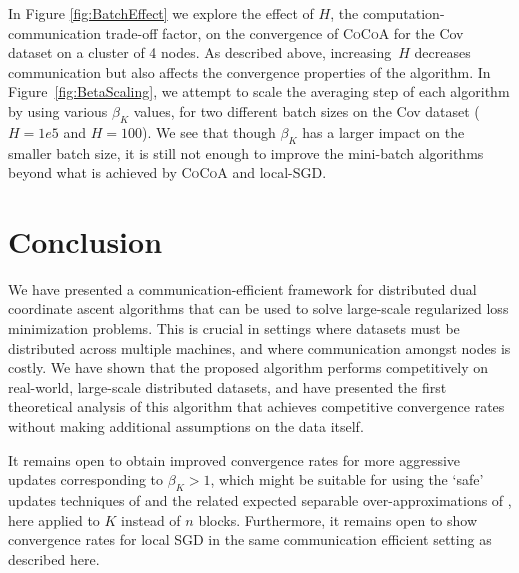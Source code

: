 \documentclass{article} %
\newcommand{\algname}{\textsc{CoCoA}\xspace}  %
\begin{document}


In Figure \ref{fig:BatchEffect} we explore the effect of $H$, 
the computation-communication trade-off factor, on the
convergence of \algname for the Cov dataset on a cluster of 4 nodes.
As described above, increasing~$H$ decreases communication 
but also affects the convergence properties of the algorithm. In 
Figure~\ref{fig:BetaScaling}, we attempt to scale the averaging step of each
algorithm by using various $\beta_K$ values, for two different batch sizes on
the Cov dataset ($H=1e5$ and $H=100$). We see that though $\beta_K$ has a
larger impact on the smaller batch size, it is still not enough to improve
the mini-batch algorithms beyond what is achieved by \algname and local-SGD.




%
\section{Conclusion} \label{conclusion}

We have presented a communication-efficient framework for distributed dual
coordinate ascent algorithms that can be used to solve large-scale regularized
loss minimization problems. This is crucial in settings where datasets must
be distributed across multiple machines, and where communication amongst nodes
is costly. We have shown that the proposed algorithm performs competitively on
real-world, large-scale distributed datasets, and have presented the first
theoretical analysis of this algorithm that achieves competitive convergence
rates without making additional assumptions on the data itself.

It remains open to obtain improved convergence rates for more aggressive
updates corresponding to $\beta_K > 1$, which might be suitable for using the
`safe' updates techniques of  \cite{Takac:2013ut} and the related expected
separable over-approximations of \cite{Richtarik:2014fe,Richtarik:2012vf}, here applied to $K$
instead of $n$ blocks.  Furthermore, it remains open to show convergence rates
for local SGD in the same communication efficient setting as described here.
\end{document}
